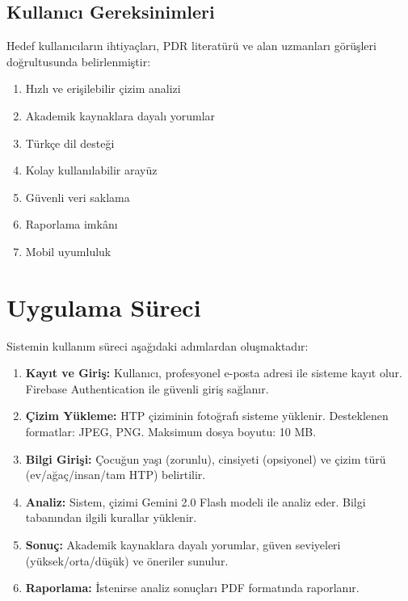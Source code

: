 \subsection{Kullanıcı Gereksinimleri}

Hedef kullanıcıların ihtiyaçları, PDR literatürü ve alan uzmanları görüşleri doğrultusunda belirlenmiştir:

\begin{enumerate}
  \item Hızlı ve erişilebilir çizim analizi
  \item Akademik kaynaklara dayalı yorumlar
  \item Türkçe dil desteği
  \item Kolay kullanılabilir arayüz
  \item Güvenli veri saklama
  \item Raporlama imkânı
  \item Mobil uyumluluk
\end{enumerate}

\section{Uygulama Süreci}

Sistemin kullanım süreci aşağıdaki adımlardan oluşmaktadır:

\begin{enumerate}
  \item \textbf{Kayıt ve Giriş:} Kullanıcı, profesyonel e-posta adresi ile sisteme kayıt olur. Firebase Authentication ile güvenli giriş sağlanır.

  \item \textbf{Çizim Yükleme:} HTP çiziminin fotoğrafı sisteme yüklenir. Desteklenen formatlar: JPEG, PNG. Maksimum dosya boyutu: 10 MB.

  \item \textbf{Bilgi Girişi:} Çocuğun yaşı (zorunlu), cinsiyeti (opsiyonel) ve çizim türü (ev/ağaç/insan/tam HTP) belirtilir.

  \item \textbf{Analiz:} Sistem, çizimi Gemini 2.0 Flash modeli ile analiz eder. Bilgi tabanından ilgili kurallar yüklenir.

  \item \textbf{Sonuç:} Akademik kaynaklara dayalı yorumlar, güven seviyeleri (yüksek/orta/düşük) ve öneriler sunulur.

  \item \textbf{Raporlama:} İstenirse analiz sonuçları PDF formatında raporlanır.
\end{enumerate}

